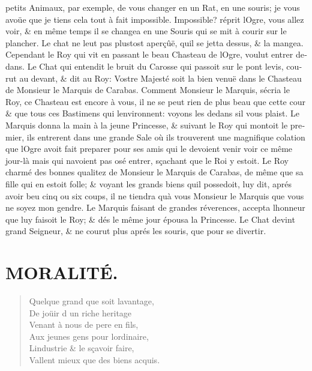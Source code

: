 \documentclass[14pt,a4paper]{memoir}
\begin{document}
\begin{otherlanguage}{french}
petits Animaux, par exemple, de vous changer en un Rat, en une souris;
je vous avoüe que je tiens cela tout à fait impossible. Impossible?
réprit l\textquotesingle Ogre, vous allez voir, \& en même temps il se
changea en une Souris qui se mit à courir sur le plancher. Le chat ne
l\textquotesingle eut pas plustost aperçûë, qu\textquotesingle il se
jetta dessus, \& la mangea. Cependant le Roy qui vit en passant le beau
Chasteau de l\textquotesingle Ogre, voulut entrer dedans. Le Chat qui
entendit le bruit du Carosse qui passoit sur le pont levis, courut au
devant, \& dit au Roy: Vostre Majesté soit la bien venuë dans le
Chasteau de Monsieur le Marquis de Carabas. Comment Monsieur le Marquis,
s\textquotesingle écria le Roy, ce Chasteau est encore à vous, il ne se
peut rien de plus beau que cette cour \& que tous ces Bastimens qui
l\textquotesingle environnent: voyons les dedans s\textquotesingle il
vous plaist. Le Marquis donna la main à la jeune Princesse, \& suivant
le Roy qui montoit le premier, ils entrerent dans une grande Sale où ils
trouverent une magnifique colation que l\textquotesingle Ogre avoit fait
preparer pour ses amis qui le devoient venir voir ce même jour-là mais
qui n\textquotesingle avoient pas osé entrer, sçachant que le Roi y
estoit. Le Roy charmé des bonnes qualitez de Monsieur le Marquis de
Carabas, de même que sa fille qui en estoit folle; \& voyant les grands
biens qu\textquotesingle il possedoit, luy dit, aprés avoir beu cinq ou
six coups, il ne tiendra qu\textquotesingle à vous Monsieur le Marquis
que vous ne soyez mon gendre. Le Marquis faisant de grandes réverences,
accepta l\textquotesingle honneur que luy faisoit le Roy; \& dés le même
jour épousa la Princesse. Le Chat devint grand Seigneur, \& ne courut
plus aprés les souris, que pour se divertir. \\

\section{MORALITÉ.}
\begin{verse}
  \small
Quelque grand que soit l\textquotesingle avantage, \\
De joüir d un riche heritage \\
Venant à nous de pere en fils, \\
Aux jeunes gens pour l\textquotesingle ordinaire, \\
L\textquotesingle industrie \& le sçavoir faire, \\
Vallent mieux que des biens acquis.


\end{verse}
\end{otherlanguage}
\end{document}
